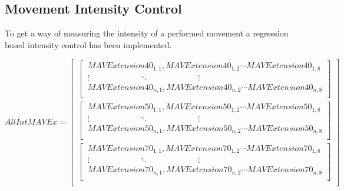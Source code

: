 
\subsection{Movement Intensity Control} 

To get a way of measuring the intensity of a performed movement a regression based intensity control has been implemented. 



\begin{equation} \label{eq:segMatrix}
AllIntMAVEx=\begin{bmatrix} 
\begin{bmatrix}
\ MAVExtension40_{1,1}, MAVExtension40_{1,2} \cdots MAVExtension40_{1,8} \\ 
\ \vdots \qquad \qquad \qquad \ddots \qquad \qquad \qquad \vdots \\
\ MAVExtension40_{n,1}, MAVExtension40_{n,2}  \cdots MAVExtension40_{n,8} \\ \end{bmatrix} \\
\begin{bmatrix} 
\ MAVExtension50_{1,1}, MAVExtension50_{1,2} \cdots MAVExtension50_{1,8} \\
\ \vdots \qquad \qquad \qquad \ddots \qquad \qquad \qquad \vdots \\
\ MAVExtension50_{n,1}, MAVExtension50_{n,2} \cdots MAVExtension50_{n,8} \\ \end{bmatrix} \\
\begin{bmatrix} 
\ MAVExtension70_{1,1}, MAVExtension70_{1,2} \cdots MAVExtension70_{1,8} \\
\ \vdots \qquad \qquad \qquad \ddots \qquad \qquad \qquad \vdots \\
\ MAVExtension70_{n,1}, MAVExtension70_{n,2} \cdots MAVExtension70_{n,8} \\ \end{bmatrix} \\
\end{bmatrix}
\end{equation}